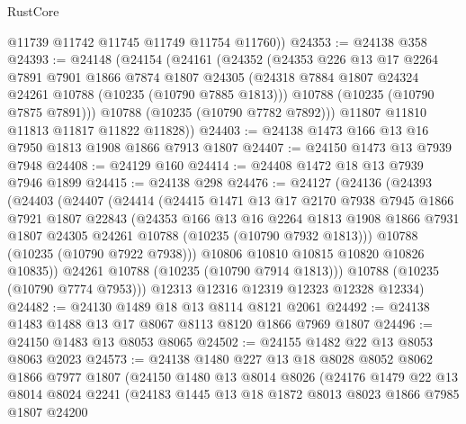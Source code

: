 \begin{lexlean}{RustCore}
\begin{coremodule}
        @11739
        @11742
        @11745
        @11749
        @11754
        @11760))
@24353 := @24138 @358
@24393 := @24148
    (@24154
      (@24161
        (@24352
          (@24353
            @226
            @13
            @17
            @2264
            @7891
            @7901
            @1866
            @7874
            @1807
            @24305
            (@24318 @7884 @1807 @24324 @24261 @10788 (@10235 (@10790 @7885 @1813)))
            @10788
            (@10235 (@10790 @7875 @7891)))
          @10788
          (@10235 (@10790 @7782 @7892)))
        @11807
        @11810
        @11813
        @11817
        @11822
        @11828))
@24403 := @24138 @1473 @166 @13 @16 @7950 @1813 @1908 @1866 @7913 @1807
@24407 := @24150 @1473 @13 @7939 @7948
@24408 := @24129 @160
@24414 := @24408 @1472 @18 @13 @7939 @7946 @1899
@24415 := @24138 @298
@24476 := @24127
    (@24136
      (@24393
        (@24403
          (@24407
            (@24414
              (@24415
                @1471
                @13
                @17
                @2170
                @7938
                @7945
                @1866
                @7921
                @1807
                @22843
                (@24353
                  @166
                  @13
                  @16
                  @2264
                  @1813
                  @1908
                  @1866
                  @7931
                  @1807
                  @24305
                  @24261
                  @10788
                  (@10235 (@10790 @7932 @1813)))
                @10788
                (@10235 (@10790 @7922 @7938)))
              @10806
              @10810
              @10815
              @10820
              @10826
              @10835))
          @24261
          @10788
          (@10235 (@10790 @7914 @1813)))
        @10788
        (@10235 (@10790 @7774 @7953)))
      @12313
      @12316
      @12319
      @12323
      @12328
      @12334)
@24482 := @24130 @1489 @18 @13 @8114 @8121 @2061
@24492 := @24138 @1483 @1488 @13 @17 @8067 @8113 @8120 @1866 @7969 @1807
@24496 := @24150 @1483 @13 @8053 @8065
@24502 := @24155 @1482 @22 @13 @8053 @8063 @2023
@24573 := @24138
    @1480
    @227
    @13
    @18
    @8028
    @8052
    @8062
    @1866
    @7977
    @1807
    (@24150
      @1480
      @13
      @8014
      @8026
      (@24176
        @1479
        @22
        @13
        @8014
        @8024
        @2241
        (@24183
          @1445
          @13
          @18
          @1872
          @8013
          @8023
          @1866
          @7985
          @1807
          @24200

\end{coremodule}
\end{lexlean}
